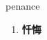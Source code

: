 
\begin{frame}
{\huge penance}
\begin{center}
\begin{enumerate}\Large
  \item \textbf{忏悔}
\end{enumerate}
\end{center}
\end{frame}

